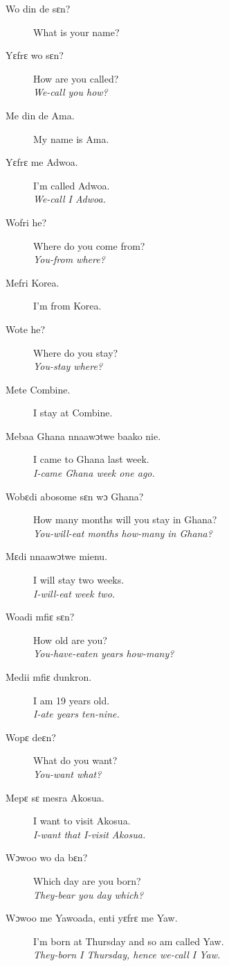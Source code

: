 \documentclass[%
 fontsize=11pt,%
 a5paper,pagesize,
 paper=a5,%
 DIV=9,%
 parskip=half*,%
 twoside=true,
 pointlessnumbers
]{scrbook}%
\begin{document}
\begin{description}
  \item[Wo din de sɛn?] What is your name?
  \item[Yɛfrɛ wo sɛn?] How are you called? \\
    \textit{We-call you how?}
  \item[Me din de Ama.] My name is Ama.
  \item[Yɛfrɛ me Adwoa.] I'm called Adwoa. \\
    \textit{We-call I Adwoa.}
  \item[Wofri he?] Where do you come from? \\
    \textit{You-from where?}
  \item[Mefri Korea.] I'm from Korea.
  \item[Wote he?] Where do you stay? \\
    \textit{You-stay where?}
  \item[Mete Combine.] I stay at Combine.
  \item[Mebaa Ghana nnaawɔtwe baako nie.] I came to Ghana last week. \\
    \textit{I-came Ghana week one ago.}
  \item[Wobɛdi abosome sɛn wɔ Ghana?] How many months will you stay in Ghana? \\
    \textit{You-will-eat months how-many in Ghana?}
  \item[Mɛdi nnaawɔtwe mienu.] I will stay two weeks. \\
    \textit{I-will-eat week two.}
  \item[Woadi mfiɛ sɛn?] How old are you? \\
    \textit{You-have-eaten years how-many?}
  \item[Medii mfiɛ dunkron.] I am 19 years old. \\
    \textit{I-ate years ten-nine.}
  \item[Wopɛ deɛn?] What do you want? \\
    \textit{You-want what?}
  \item[Mepɛ sɛ mesra Akosua.] I want to visit Akosua. \\
    \textit{I-want that I-visit Akosua.}
  \item[Wɔwoo wo da bɛn?] Which day are you born? \\
    \textit{They-bear you day which?}
  \item[Wɔwoo me Yawoada, enti yɛfrɛ me Yaw.] I'm born at Thursday and so am called Yaw. \\
    \textit{They-born I Thursday, hence we-call I Yaw.}
\end{description}
\end{document}

